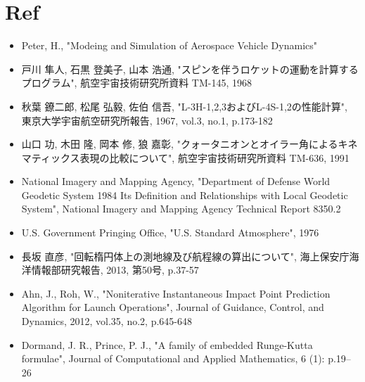 ﻿\documentclass[a4paper]{jsarticle}
\begin{document}
\section{Ref}
\begin{itemize}
  \item Peter, H., "Modeing and Simulation of Aerospace Vehicle Dynamics"
  \item 戸川 隼人, 石黒 登美子, 山本 浩通, "スピンを伴うロケットの運動を計算するプログラム", 航空宇宙技術研究所資料 TM-145, 1968
  \item 秋葉 鐐二郎, 松尾 弘毅, 佐伯 信吾, "L-3H-1,2,3およびL-4S-1,2の性能計算", 東京大学宇宙航空研究所報告, 1967, vol.3, no.1, p.173-182
  \item 山口 功, 木田 隆, 岡本 修, 狼 嘉彰, "クォータニオンとオイラー角によるキネマティックス表現の比較について", 航空宇宙技術研究所資料 TM-636, 1991
  \item National Imagery and Mapping Agency, "Department of Defense World Geodetic System 1984 Its Definition and Relationships with Local Geodetic System", National Imagery and Mapping Agency Technical Report 8350.2
  \item U.S. Government Pringing Office, "U.S. Standard Atmosphere", 1976
  \item 長坂 直彦, "回転楕円体上の測地線及び航程線の算出について", 海上保安庁海洋情報部研究報告, 2013, 第50号, p.37-57
  \item Ahn, J., Roh, W., "Noniterative Instantaneous Impact Point Prediction Algorithm for Launch Operations", Journal of Guidance, Control, and Dynamics, 2012, vol.35, no.2, p.645-648
  \item Dormand, J. R., Prince, P. J., "A family of embedded Runge-Kutta formulae", Journal of Computational and Applied Mathematics, 6 (1): p.19–26
\end{itemize}
\end{document}
